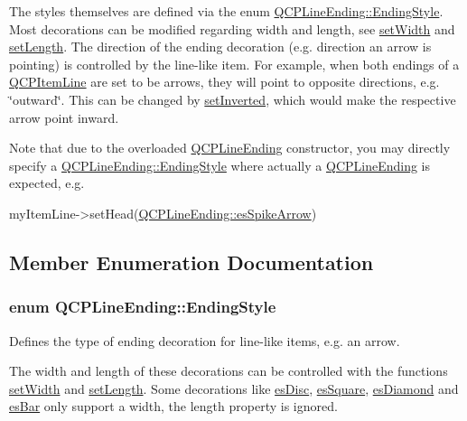 The styles themselves are defined via the enum \hyperlink{classQCPLineEnding_a5ef16e6876b4b74959c7261d8d4c2cd5}{Q\-C\-P\-Line\-Ending\-::\-Ending\-Style}. Most decorations can be modified regarding width and length, see \hyperlink{classQCPLineEnding_a26dc020ea985a72cc25881ce2115e34e}{set\-Width} and \hyperlink{classQCPLineEnding_ae36fa01763751cd64b7f56c3507e935a}{set\-Length}. The direction of the ending decoration (e.\-g. direction an arrow is pointing) is controlled by the line-\/like item. For example, when both endings of a \hyperlink{classQCPItemLine}{Q\-C\-P\-Item\-Line} are set to be arrows, they will point to opposite directions, e.\-g. \char`\"{}outward\char`\"{}. This can be changed by \hyperlink{classQCPLineEnding_a580e4e2360b35ebb8d68f3494aa2335d}{set\-Inverted}, which would make the respective arrow point inward.

Note that due to the overloaded \hyperlink{classQCPLineEnding}{Q\-C\-P\-Line\-Ending} constructor, you may directly specify a \hyperlink{classQCPLineEnding_a5ef16e6876b4b74959c7261d8d4c2cd5}{Q\-C\-P\-Line\-Ending\-::\-Ending\-Style} where actually a \hyperlink{classQCPLineEnding}{Q\-C\-P\-Line\-Ending} is expected, e.\-g.
\begin{DoxyCode}
myItemLine->setHead(\hyperlink{classQCPLineEnding_a5ef16e6876b4b74959c7261d8d4c2cd5ab9964d0d03f812d1e79de15edbeb2cbf}{QCPLineEnding::esSpikeArrow}) 
\end{DoxyCode}
 

\subsection{Member Enumeration Documentation}
\hypertarget{classQCPLineEnding_a5ef16e6876b4b74959c7261d8d4c2cd5}{
\subsubsection[{Ending\-Style}]{\setlength{\rightskip}{0pt plus 5cm}enum {\bf Q\-C\-P\-Line\-Ending\-::\-Ending\-Style}}}\label{classQCPLineEnding_a5ef16e6876b4b74959c7261d8d4c2cd5}
Defines the type of ending decoration for line-\/like items, e.\-g. an arrow.



The width and length of these decorations can be controlled with the functions \hyperlink{classQCPLineEnding_a26dc020ea985a72cc25881ce2115e34e}{set\-Width} and \hyperlink{classQCPLineEnding_ae36fa01763751cd64b7f56c3507e935a}{set\-Length}. Some decorations like \hyperlink{classQCPLineEnding_a5ef16e6876b4b74959c7261d8d4c2cd5ae5a3414916817258bcc6dddd605e8f5c}{es\-Disc}, \hyperlink{classQCPLineEnding_a5ef16e6876b4b74959c7261d8d4c2cd5ae1836502fa43d8990bb62b2d493a140a}{es\-Square}, \hyperlink{classQCPLineEnding_a5ef16e6876b4b74959c7261d8d4c2cd5a378fe5a8b768411b0bc1765210fe7200}{es\-Diamond} and \hyperlink{classQCPLineEnding_a5ef16e6876b4b74959c7261d8d4c2cd5a2cf543bbca332df26d89bf779f50469f}{es\-Bar} only support a width, the length property is ignored.

